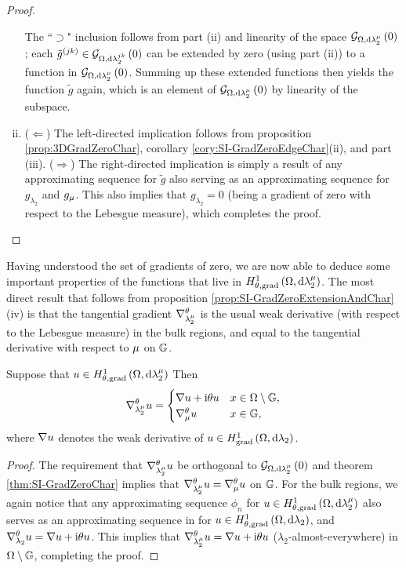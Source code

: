 \begin{proof}
\begin{enumerate}[(i)]
		The ``$\supset$" inclusion follows from part (ii) and linearity of the space $\mathcal{G}_{ \Omega, \mathrm{d}\lambda_2^{\mu}}\left( 0 \right)$; each $\tilde{g}^{(jk)}\in\mathcal{G}_{ \Omega, \mathrm{d}\lambda_2^{jk}}\left( 0 \right)$ can be extended by zero (using part (ii)) to a function in $\mathcal{G}_{ \Omega, \mathrm{d}\lambda_2^{\mu}}\left( 0 \right)$.
		Summing up these extended functions then yields the function $\tilde{g}$ again, which is an element of $\mathcal{G}_{ \Omega, \mathrm{d}\lambda_2^{\mu}}\left( 0 \right)$ by linearity of the subspace.
		\item ($\Leftarrow$) The left-directed implication follows from proposition \ref{prop:3DGradZeroChar}, corollary \ref{cory:SI-GradZeroEdgeChar}(ii), and part (iii). \newline
	($\Rightarrow$) The right-directed implication is simply a result of any approximating sequence for $\tilde{g}$ also serving as an approximating sequence for $g_{\lambda_2}$ and $g_{\mu}$.
	This also implies that $g_{\lambda_2} = 0$ (being a gradient of zero with respect to the Lebesgue measure), which completes the proof.
	\end{enumerate}
\end{proof}

Having understood the set of gradients of zero, we are now able to deduce some important properties of the functions that live in $H^1_{\theta, \mathrm{grad}}\left( \Omega, \mathrm{d}\lambda_2^{\mu} \right)$.
The most direct result that follows from proposition \ref{prop:SI-GradZeroExtensionAndChar}(iv) is that the tangential gradient $\nabla^{\theta}_{\lambda_2^{\mu}}$ is the usual weak derivative (with respect to the Lebesgue measure) in the bulk regions, and equal to the tangential derivative with respect to $\mu$ on $\mathbb{G}$.
\begin{cory}
	Suppose that $u\in H^1_{\theta, \mathrm{grad}}\left( \Omega, \mathrm{d}\lambda_2^{\mu} \right)$
	Then 
	\begin{align*}
		\nabla^{\theta}_{\lambda_2^{\mu}}u = \begin{cases} \nabla u + \mathrm{i}\theta u & x\in\Omega\setminus\mathbb{G}, \\ \nabla^{\theta}_{\mu}u & x\in\mathbb{G}, \end{cases}
	\end{align*}
	where $\nabla u$ denotes the weak derivative of $u\in H^1_\mathrm{grad}\left( \Omega, \mathrm{d}\lambda_2 \right)$.
\end{cory}
\begin{proof}
	The requirement that $\nabla^{\theta}_{\lambda_2^{\mu}}u$ be orthogonal to $\mathcal{G}_{ \Omega, \mathrm{d}\lambda_2^{\mu}}\left( 0 \right)$ and theorem \ref{thm:SI-GradZeroChar} implies that $\nabla^{\theta}_{\lambda_2^{\mu}}u = \nabla^{\theta}_{\mu}u$ on $\mathbb{G}$.
	For the bulk regions, we again notice that any approximating sequence $\phi_n$ for $u\in H^1_{\theta, \mathrm{grad}}\left( \Omega, \mathrm{d}\lambda_2^{\mu} \right)$ also serves as an approximating sequence in for $u\in H^1_{\theta, \mathrm{grad}}\left( \Omega, \mathrm{d}\lambda_2 \right)$, and $\nabla^{\theta}_{\lambda_2}u = \nabla u + \mathrm{i}\theta u$.
	This implies that $\nabla^{\theta}_{\lambda_2^{\mu}}u = \nabla u + \mathrm{i}\theta u$ ($\lambda_2$-almost-everywhere) in $\Omega\setminus\mathbb{G}$, completing the proof.
\end{proof}

